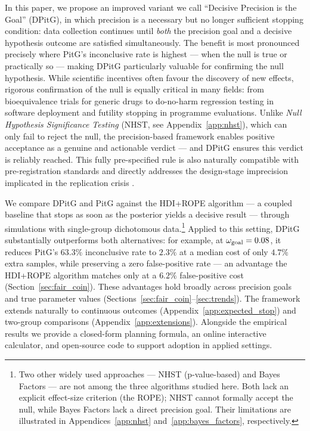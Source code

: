 In this paper, we propose an improved variant we call
``Decisive Precision is the Goal'' (DPitG), in which precision is a necessary but no
longer sufficient stopping condition: data collection continues until \textit{both} the
precision goal and a decisive hypothesis outcome are satisfied simultaneously.
The benefit is most pronounced precisely where PitG's inconclusive rate is highest ---
when the null is true or practically so --- making DPitG particularly valuable for
confirming the null hypothesis.
While scientific incentives often favour the discovery of new effects,
rigorous confirmation of the null is equally critical in many fields: from bioequivalence
trials for generic drugs \citep{schuirmann1987, karalis2012}
to do-no-harm regression testing in software
deployment and futility stopping in programme evaluations.
Unlike \textit{Null Hypothesis Significance Testing} (NHST, see Appendix~\ref{app:nhst}),
which can only fail to reject the null, the precision-based framework enables positive
acceptance as a genuine and actionable verdict --- and DPitG ensures this verdict is
reliably reached.
This fully pre-specified rule is also naturally compatible with pre-registration standards
\citep{nosek2018} and directly addresses the design-stage imprecision implicated in
the replication crisis \citep{osc2015, gelman2014}.

We compare DPitG and PitG against the HDI+ROPE algorithm --- a coupled baseline that stops as
soon as the posterior yields a decisive result --- through simulations with
single-group dichotomous data.\footnote{Two other widely used approaches --- NHST
(p-value-based) and Bayes Factors --- are not among the three algorithms studied
here. Both lack an explicit effect-size criterion (the ROPE); NHST cannot formally
accept the null, while Bayes Factors lack a direct precision goal.
Their limitations are illustrated in Appendices~\ref{app:nhst}
and~\ref{app:bayes_factors}, respectively.}
Applied to this setting, DPitG substantially outperforms both alternatives: for
example, at $\omega_{\rm goal}=0.08$, it reduces PitG's $63.3\%$ inconclusive rate
to $2.3\%$ at a median cost of only $4.7\%$ extra samples, while preserving a zero
false-positive rate --- an advantage the HDI+ROPE algorithm matches only at a $6.2\%$
false-positive cost (Section~\ref{sec:fair_coin}). These advantages hold broadly
across precision goals and true parameter values
(Sections~\ref{sec:fair_coin}--\ref{sec:trends}).
The framework extends naturally to continuous outcomes
(Appendix~\ref{app:expected_stop}) and two-group comparisons
(Appendix~\ref{app:extensions}).
Alongside the empirical results we provide a closed-form planning formula, an online
interactive calculator, and open-source code to support adoption in applied settings.

